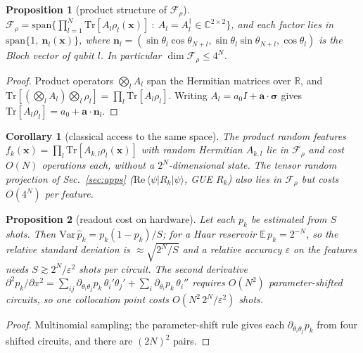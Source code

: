 \documentclass[11pt]{article}
\newtheorem{proposition}{Proposition}
\newtheorem{corollary}{Corollary}
\theoremstyle{remark}\newtheorem*{remark}{Remark}
\begin{document}
\begin{proposition}[product structure of $\mathcal F_\rho$]\label{prop:product}
$\mathcal F_\rho=\mathrm{span}\big\{\prod_{l=1}^N\mathrm{Tr}[A_l\rho_l(\bm x)]\ :\ A_l=A_l^\dagger\in\mathbb C^{2\times2}\big\}$,
and each factor lies in $\mathrm{span}\{1,\ \bm n_l(\bm x)\}$, where $\bm n_l=(\sin\theta_l\cos\theta_{N+l},
\sin\theta_l\sin\theta_{N+l},\cos\theta_l)$ is the Bloch vector of qubit $l$. In particular $\dim\mathcal F_\rho\le4^N$.
\end{proposition}
\begin{proof}
Product operators $\bigotimes_lA_l$ span the Hermitian matrices over $\mathbb R$, and
$\mathrm{Tr}[(\bigotimes_lA_l)\bigotimes_l\rho_l]=\prod_l\mathrm{Tr}[A_l\rho_l]$.
Writing $A_l=a_0I+\bm a\cdot\bm\sigma$ gives $\mathrm{Tr}[A_l\rho_l]=a_0+\bm a\cdot\bm n_l$.
\end{proof}

\begin{corollary}[classical access to the same space]\label{cor:classical}
The product random features $f_k(\bm x)=\prod_l\mathrm{Tr}[A_{k,l}\rho_l(\bm x)]$ with random Hermitian $A_{k,l}$
lie in $\mathcal F_\rho$ and cost $O(N)$ operations each, without a $2^N$-dimensional state.
The tensor random projection of Sec.~\ref{sec:apps} ($\mathrm{Re}\,\langle\psi|R_k|\psi\rangle$, GUE $R_k$) also lies in
$\mathcal F_\rho$ but costs $O(4^N)$ per feature.
\end{corollary}

\begin{proposition}[readout cost on hardware]\label{prop:shots}
Let each $p_k$ be estimated from $S$ shots. Then $\mathrm{Var}\,\hat p_k=p_k(1-p_k)/S$; for a Haar reservoir
$\mathbb E\,p_k=2^{-N}$, so the relative standard deviation is $\approx\sqrt{2^N/S}$ and a relative accuracy $\varepsilon$
on the features needs $S\gtrsim2^N/\varepsilon^2$ shots per circuit. The second derivative
$\partial^2p_k/\partial x^2=\sum_{ij}\partial_{\theta_i\theta_j}p_k\,\theta_i'\theta_j'+\sum_i\partial_{\theta_i}p_k\,\theta_i''$
requires $O(N^2)$ parameter-shifted circuits, so one collocation point costs $O(N^2\,2^N/\varepsilon^2)$ shots.
\end{proposition}
\begin{proof}
Multinomial sampling; the parameter-shift rule \citep{mitarai2018qcl,schuld2019gradients} gives each
$\partial_{\theta_i\theta_j}p_k$ from four shifted circuits, and there are $(2N)^2$ pairs.
\end{proof}
\end{document}
